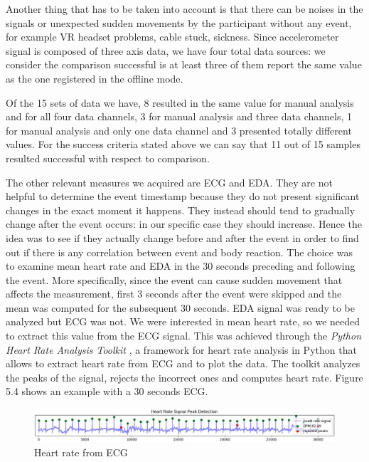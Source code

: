\documentclass[binding=0.6cm,LaM]{sapthesis}
\begin{document}
Another thing that has to be taken into account is that there can be noises in the signals or unexpected sudden movements by the participant without any event, for example VR headset problems, cable stuck, sickness. Since accelerometer signal is composed of three axis data, we have four total data sources: we consider the comparison successful is at least three of them report the same value as the one registered in the offline mode.

Of the 15 sets of data we have, 8 resulted in the same value for manual analysis and for all four data channels, 3 for manual analysis and three data channels, 1 for manual analysis and only one data channel and 3 presented totally different values. For the success criteria stated above we can say that 11 out of 15 samples resulted successful with respect to comparison.

The other relevant measures we acquired are ECG and EDA. They are not helpful to determine the event timestamp because they do not present significant changes in the exact moment it happens. They instead should tend to gradually change after the event occurs: in our specific case they should increase. 
Hence the idea was to see if they actually change before and after the event in order to find out if there is any correlation between event and body reaction. The choice was to examine mean heart rate and EDA in the 30 seconds preceding and following the event. More specifically, since the event can cause sudden movement that affects the measurement, first 3 seconds after the event were skipped and the mean was computed for the subsequent 30 seconds. EDA signal was ready to be analyzed but ECG was not. We were interested in mean heart rate, so we needed to extract this value from the ECG signal. This was achieved through the \textit{Python Heart Rate Analysis Toolkit} \cite{vanheart}, a framework for heart rate analysis in Python that allows to extract heart rate from ECG and to plot the data. The toolkit analyzes the peaks of the signal, rejects the incorrect ones and computes heart rate. Figure 5.4 shows an example with a 30 seconds ECG.

\begin{figure}[h]
\centering
\includegraphics[scale=.419]{images/peaks0}
\caption{Heart rate from ECG}
\end{figure}
\end{document}
